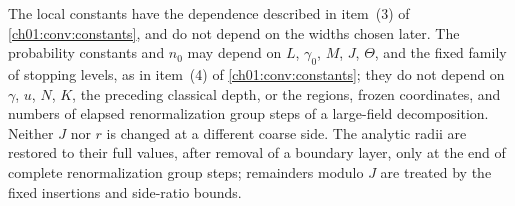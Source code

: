\begin{theorem}
The local constants have the dependence described in item~(3) of \cref{ch01:conv:constants}, and do not depend on the widths chosen later. The probability constants and $n_0$ may depend on $L$, $\gamma_0$, $M$, $J$, $\Theta$, and the fixed family of stopping levels, as in item~(4) of \cref{ch01:conv:constants}; they do not depend on $\gamma$, $u$, $N$, $K$, the preceding classical depth, or the regions, frozen coordinates, and numbers of elapsed renormalization group steps of a large-field decomposition. Neither $J$ nor $r$ is changed at a different coarse side. The analytic radii are restored to their full values, after removal of a boundary layer, only at the end of complete renormalization group steps; remainders modulo $J$ are treated by the fixed insertions and side-ratio bounds.
\end{theorem}

